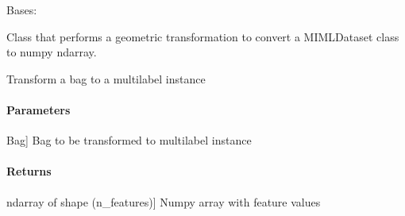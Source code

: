 \documentclass[letterpaper,10pt,english]{sphinxmanual}
\begin{document}
\begin{fulllineitems}
\label{\detokenize{transformation/mimlTOml/_autosummary/miml.transformation.mimlTOml.geometric.GeometricTransformation:miml.transformation.mimlTOml.geometric.GeometricTransformation}}
\pysigstartsignatures
{}
\pysigstopsignatures
\sphinxAtStartPar
Bases: {\hyperref[\detokenize{transformation/mimlTOml/_autosummary/miml.transformation.mimlTOml.miml_to_ml_transformation.MIMLtoMLTransformation:miml.transformation.mimlTOml.miml_to_ml_transformation.MIMLtoMLTransformation}]{}}

\sphinxAtStartPar
Class that performs a geometric transformation to convert a MIMLDataset class to numpy ndarray.

\begin{fulllineitems}
\label{\detokenize{transformation/mimlTOml/_autosummary/miml.transformation.mimlTOml.geometric.GeometricTransformation:miml.transformation.mimlTOml.geometric.GeometricTransformation.transform_bag}}
\pysigstartsignatures
{}
\pysigstopsignatures
\sphinxAtStartPar
Transform a bag to a multilabel instance


\paragraph{Parameters}
\label{\detokenize{transformation/mimlTOml/_autosummary/miml.transformation.mimlTOml.geometric.GeometricTransformation:parameters}}\begin{description}
\sphinxlineitem{bag}{[}Bag{]}
\sphinxAtStartPar
Bag to be transformed to multilabel instance

\end{description}


\paragraph{Returns}
\label{\detokenize{transformation/mimlTOml/_autosummary/miml.transformation.mimlTOml.geometric.GeometricTransformation:returns}}\begin{description}
\sphinxlineitem{features}{[}ndarray of shape (n\_features){]}
\sphinxAtStartPar
Numpy array with feature values


\end{description}
\end{fulllineitems}
\end{fulllineitems}
\end{document}
